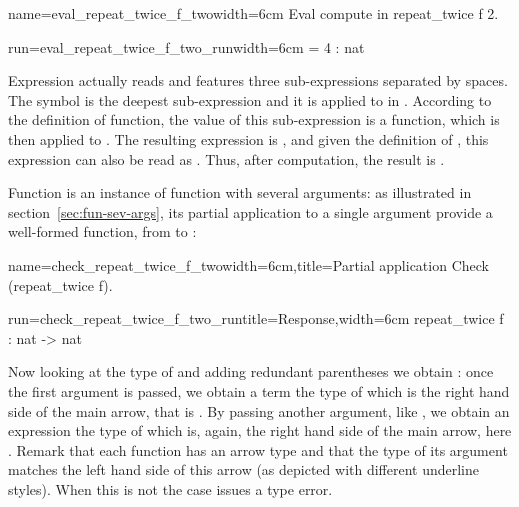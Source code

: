 \begin{coq}{name=eval_repeat_twice_f_two}{width=6cm}
Eval compute in repeat_twice f 2.
\end{coq}
\begin{coqout}{run=eval_repeat_twice_f_two_run}{width=6cm}
= 4 : nat
\end{coqout}

Expression  actually reads
 and features three sub-expressions separated by
spaces. The symbol  is the deepest
sub-expression and it is applied to  in .
According to the definition of  function, the value of
this sub-expression is a function, which is then applied to .
The resulting expression is , and given the
definition of , this expression can also
be read as .  Thus, after computation, the result is .

Function   is an instance of function with several
arguments: as illustrated in section~\ref{sec:fun-sev-args}, its
partial application to a single argument provide a well-formed
function, from  to :

\begin{coq}{name=check_repeat_twice_f_two}{width=6cm,title=Partial application}
Check (repeat_twice f).
\end{coq}
\begin{coqout}{run=check_repeat_twice_f_two_run}{title=Response,width=6cm}
repeat_twice f : nat -> nat
\end{coqout}

Now looking at the type of  and adding redundant parentheses
we obtain :
once the first argument
 is passed, we obtain a term the type of which is
the right hand side of the main arrow, that is .
By passing another argument, like , we obtain an expression
the type of which is, again, the right hand side of the main arrow,
here .
Remark that each function has an arrow type and that the type of its
argument matches the left hand side of this arrow (as depicted with
different underline styles). When this is not the case \Coq{} issues a
type error.

